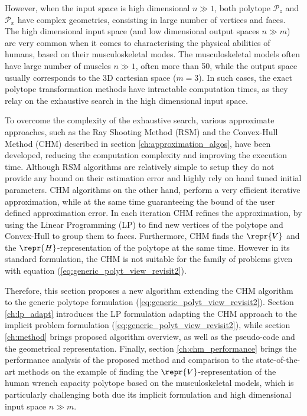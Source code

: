 However, when the input space is high dimensional $n\gg1$, both polytope $\mathcal{P}_z$ and $\mathcal{P}_x$ have complex geometries, consisting in large number of vertices and faces. The high dimensional input space (and low dimensional output spaces $n\gg m$) are very common when it comes to characterising the physical abilities of humans, based on their musculoskeletal modes. The musculoskeletal models often have large number of muscles $n\gg1$, often more than 50, while the output space usually corresponds to the 3D cartesian space ($m=3$). In such cases, the exact polytope transformation methods have intractable computation times, as they relay on the exhaustive search in the high dimensional input space.

To overcome the complexity of the exhaustive search, various approximate approaches, such as the Ray Shooting Method (RSM)  \cite{agarwal1993ray} and the Convex-Hull Method (CHM) \cite{lassez1992quantifier} described in section \ref{ch:approximation_algos}, have been developed, reducing the computation complexity and improving the execution time. 
Although RSM algorithms are relatively simple to setup they do not provide any bound on their estimation error and highly rely on hand tuned initial parameters. 
CHM \cite{lassez1992quantifier} algorithms on the other hand, perform a very efficient iterative approximation,  while at the same time guaranteeing the bound of the user defined approximation error. In each iteration CHM refines the approximation, by using the Linear Programming (LP) to find new vertices of the polytope and Convex-Hull to group them to faces. Furthermore, CHM finds the $\repr{V}$ and the $\repr{H}$-representation of the polytope at the same time. However in its standard formulation, the CHM is not suitable for the family of problems given with equation (\ref{eq:generic_polyt_view_revisit2}). 

Therefore, this section proposes a new algorithm extending the CHM algorithm to the generic polytope formulation (\ref{eq:generic_polyt_view_revisit2}). Section \ref{ch:lp_adapt} introduces the LP formulation adapting the CHM approach to the implicit problem formulation (\ref{eq:generic_polyt_view_revisit2}), while section \ref{ch:method} brings proposed algorithm overview, as well as the pseudo-code and the geometrical representation. Finally, section \ref{ch:chm_performance} brings the performance analysis of the proposed method and comparison to the state-of-the-art methods on the example of finding the $\repr{V}$-representation of the human wrench capacity polytope based on the musculoskeletal models, which is particularly challenging both due its implicit formulation and high dimensional input space $n\gg m$.

